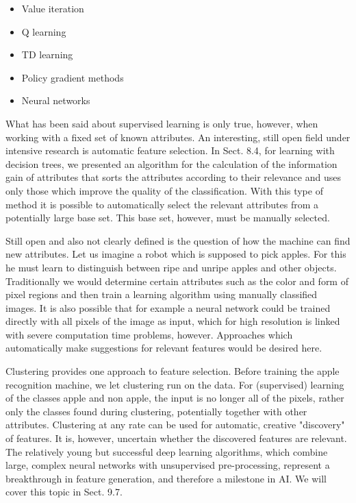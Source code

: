 \documentclass[10pt]{article}
\begin{document}
\begin{itemize}
  \item Value iteration
  \item Q learning
  \item TD learning
  \item Policy gradient methods
  \item Neural networks
\end{itemize}

What has been said about supervised learning is only true, however, when working with a fixed set of known attributes. An interesting, still open field under intensive research is automatic feature selection. In Sect. 8.4, for learning with decision trees, we presented an algorithm for the calculation of the information gain of attributes that sorts the attributes according to their relevance and uses only those which improve the quality of the classification. With this type of method it is possible to automatically select the relevant attributes from a potentially large base set. This base set, however, must be manually selected.

Still open and also not clearly defined is the question of how the machine can find new attributes. Let us imagine a robot which is supposed to pick apples. For this he must learn to distinguish between ripe and unripe apples and other objects. Traditionally we would determine certain attributes such as the color and form of pixel regions and then train a learning algorithm using manually classified images. It is also possible that for example a neural network could be trained directly with all pixels of the image as input, which for high resolution is linked with severe computation time problems, however. Approaches which automatically make suggestions for relevant features would be desired here.

Clustering provides one approach to feature selection. Before training the apple recognition machine, we let clustering run on the data. For (supervised) learning of the classes apple and non apple, the input is no longer all of the pixels, rather only the classes found during clustering, potentially together with other attributes. Clustering at any rate can be used for automatic, creative "discovery" of features. It is, however, uncertain whether the discovered features are relevant. The relatively young but successful deep learning algorithms, which combine large, complex neural networks with unsupervised pre-processing, represent a breakthrough in feature generation, and therefore a milestone in AI. We will cover this topic in Sect. 9.7.
\end{document}
